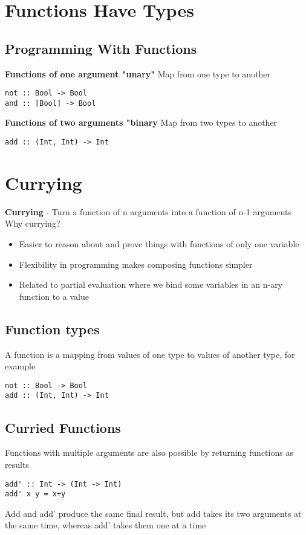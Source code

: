 \documentclass{article}[18pt]
\begin{document}
\section{Functions Have Types}
\subsection{Programming With Functions}
\textbf{Functions of one argument "unary"} Map from one type to another
\begin{verbatim}
not :: Bool -> Bool
and :: [Bool] -> Bool
\end{verbatim}
\textbf{Functions of two arguments "binary} Map from two types to another
\begin{verbatim}
add :: (Int, Int) -> Int
\end{verbatim}
\section{Currying}
\textbf{Currying} - Turn a function of n arguments into a function of n-1 arguments\\
Why currying?
\begin{itemize}
	\item Easier to reason about and prove things with functions of only one variable
	\item Flexibility in programming makes composing functions simpler
	\item Related to partial evaluation where we bind some variables in an n-ary function to a value
\end{itemize}
\subsection{Function types}
A function is a mapping from values of one type to values of another type, for example
\begin{verbatim}
not :: Bool -> Bool
add :: (Int, Int) -> Int
\end{verbatim}
\subsection{Curried Functions}
Functions with multiple arguments are also possible by returning functions as results
\begin{verbatim}
add' :: Int -> (Int -> Int)
add' x y = x+y
\end{verbatim}
Add and add' produce the same final result, but add takes its two arguments at the same time, whereas add' takes them one at a time
\end{document}
